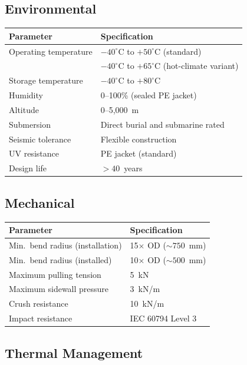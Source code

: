 \documentclass[11pt, a4paper]{article}
\begin{document}
\subsection{Environmental}

\begin{center}
\begin{tabular}{@{}ll@{}}
\toprule
\textbf{Parameter} & \textbf{Specification} \\
\midrule
Operating temperature & $-40^\circ$C to $+50^\circ$C (standard) \\
 & $-40^\circ$C to $+65^\circ$C (hot-climate variant) \\
Storage temperature & $-40^\circ$C to $+80^\circ$C \\
Humidity & 0--100\% (sealed PE jacket) \\
Altitude & 0--5{,}000~m \\
Submersion & Direct burial and submarine rated \\
Seismic tolerance & Flexible construction \\
UV resistance & PE jacket (standard) \\
Design life & $> 40$~years \\
\bottomrule
\end{tabular}
\end{center}

\subsection{Mechanical}

\begin{center}
\begin{tabular}{@{}ll@{}}
\toprule
\textbf{Parameter} & \textbf{Specification} \\
\midrule
Min.\ bend radius (installation) & 15$\times$ OD ($\sim 750$~mm) \\
Min.\ bend radius (installed) & 10$\times$ OD ($\sim 500$~mm) \\
Maximum pulling tension & 5~kN \\
Maximum sidewall pressure & 3~kN/m \\
Crush resistance & 10~kN/m \\
Impact resistance & IEC 60794 Level 3 \\
\bottomrule
\end{tabular}
\end{center}

\subsection{Thermal Management}
\end{document}

